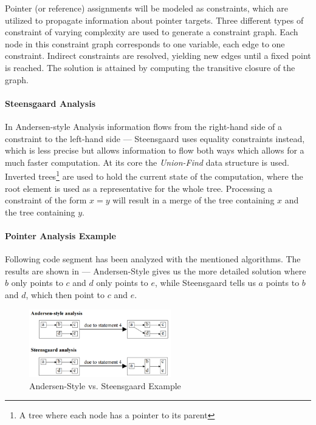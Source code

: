 \documentclass[article]{uibk}
\begin{document}
Pointer (or reference) assignments will be modeled as constraints, which are
utilized to propagate information about pointer targets. Three different types
of constraint of varying complexity are used to generate a constraint graph.
Each node in this constraint graph corresponds to one variable, each edge to
one constraint. Indirect constraints are resolved, yielding new edges until a
fixed point is reached. The solution is attained by computing the transitive
closure of the graph.

\paragraph{Steensgaard Analysis}

In Andersen-style Analysis information flows from the right-hand side of a
constraint to the left-hand side --- Steensgaard uses equality constraints
instead, which is less precise but allows information to flow both ways which
allows for a much faster computation. At its core the \textit{Union-Find} data
structure is used. Inverted trees\footnote{A tree where each node has a pointer
to its parent} are used to hold the current state of the computation, where the
root element is used as a representative for the whole tree. Processing a
constraint of the form $x = y$ will result in a merge of the tree containing
$x$ and the tree containing $y$.

\paragraph{Pointer Analysis Example}

Following code segment has been analyzed with the mentioned algorithms. The
results are shown in  --- Andersen-Style gives us
the more detailed solution where $b$ only points to $c$ and $d$ only points to
$e$, while Steensgaard tells us $a$ points to $b$ and $d$, which then point to
$c$ and $e$.

\newpage

\begin{figure}
    \centering
    \includegraphics[width=0.55\textwidth]{gfx/pointer_analysis.png}
    \caption{Andersen-Style vs. Steensgaard Example}
    \label{fig:pointer_analysis}
\end{figure}
\end{document}
